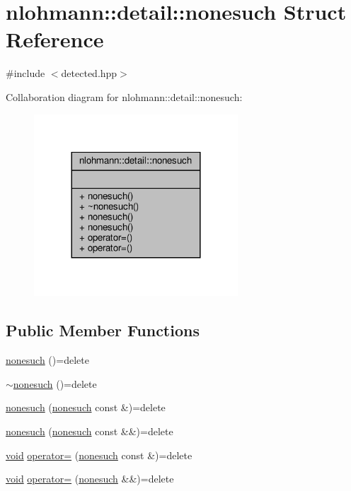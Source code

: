 \hypertarget{structnlohmann_1_1detail_1_1nonesuch}{}\section{nlohmann\+:\+:detail\+:\+:nonesuch Struct Reference}
\label{structnlohmann_1_1detail_1_1nonesuch}


{\ttfamily \#include $<$detected.\+hpp$>$}



Collaboration diagram for nlohmann\+:\+:detail\+:\+:nonesuch\+:
\nopagebreak
\begin{figure}[H]
\begin{center}
\leavevmode
\includegraphics[width=216pt]{structnlohmann_1_1detail_1_1nonesuch__coll__graph}
\end{center}
\end{figure}
\subsection*{Public Member Functions}
\begin{DoxyCompactItemize}
\item 
\hyperlink{structnlohmann_1_1detail_1_1nonesuch_a6fe87da966856c6cb06617940d90f010}{nonesuch} ()=delete
\item 
\hyperlink{structnlohmann_1_1detail_1_1nonesuch_a7b1119845860e548b67f1644a2084373}{$\sim$nonesuch} ()=delete
\item 
\hyperlink{structnlohmann_1_1detail_1_1nonesuch_a563462ef2d05fe60cdf1dc7f567dc276}{nonesuch} (\hyperlink{structnlohmann_1_1detail_1_1nonesuch}{nonesuch} const \&)=delete
\item 
\hyperlink{structnlohmann_1_1detail_1_1nonesuch_ad7719f7d2a00263be8b8d123870217d8}{nonesuch} (\hyperlink{structnlohmann_1_1detail_1_1nonesuch}{nonesuch} const \&\&)=delete
\item 
\hyperlink{namespacenlohmann_1_1detail_a59fca69799f6b9e366710cb9043aa77d}{void} \hyperlink{structnlohmann_1_1detail_1_1nonesuch_add6ef84c52a851e391cef514c85f2ffe}{operator=} (\hyperlink{structnlohmann_1_1detail_1_1nonesuch}{nonesuch} const \&)=delete
\item 
\hyperlink{namespacenlohmann_1_1detail_a59fca69799f6b9e366710cb9043aa77d}{void} \hyperlink{structnlohmann_1_1detail_1_1nonesuch_a78ca022a1b4defe4f7ba662843602231}{operator=} (\hyperlink{structnlohmann_1_1detail_1_1nonesuch}{nonesuch} \&\&)=delete
\end{DoxyCompactItemize}


